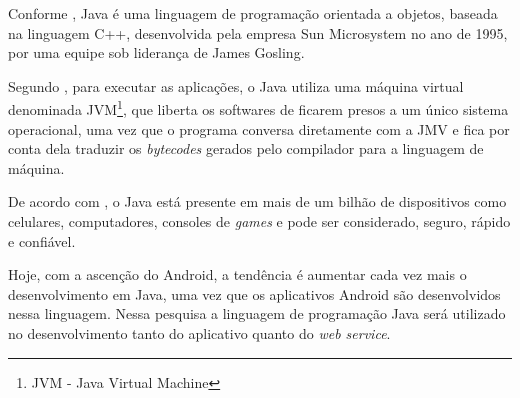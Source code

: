 
	\par Conforme , Java é uma linguagem de programação
orientada a objetos, baseada na linguagem C++, desenvolvida pela empresa
Sun Microsystem no ano de {1995}, por uma equipe sob liderança de James
Gosling.

	\par Segundo , para executar as aplicações, o
Java utiliza uma máquina virtual denominada JVM\footnote{JVM - Java
Virtual Machine}, que liberta os softwares de ficarem presos a um único sistema
operacional, uma vez que o programa conversa diretamente com a JMV e fica por
conta dela traduzir os \textit{bytecodes} gerados pelo compilador para a
linguagem de máquina.

	\par De acordo com , o Java está presente em mais de
um bilhão de dispositivos como celulares, computadores, consoles de
\textit{games} e pode ser considerado, seguro, rápido e confiável.

	\par Hoje, com a ascenção do Android, a tendência é aumentar cada vez mais o
desenvolvimento em Java, uma vez que os aplicativos Android são desenvolvidos
nessa linguagem. Nessa pesquisa a linguagem de programação Java será utilizado
no desenvolvimento tanto do aplicativo quanto do \textit{web service}.
